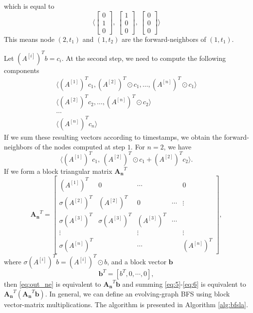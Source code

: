 \documentclass[11pt, conference, , compsocconf]{IEEEtran}
\theoremstyle{definition}
\begin{document}
which is equal to 
\[
\Big\langle
\begin{bmatrix}
0 \\
1 \\
0
\end{bmatrix},~
\begin{bmatrix}
1 \\
0 \\
0
\end{bmatrix},~
\begin{bmatrix}
0 \\
0 \\
0
\end{bmatrix}
\Big\rangle
\]
This means node $(2,t_1)$ and $(1,t_2)$ are the forward-neighbors of $(1,t_1)$. 

Let $(A^{[i]})^Tb = c_i$.
At the second step, we need to compute the following components
\begin{align}
  \label{eq:5}
 \big\langle (A^{[1]})^Tc_1,   (A^{[2]})^T\odot c_1, \ldots,  (A^{[n]})^T\odot c_1  \big\rangle  \\  
\big\langle (A^{[2]})^Tc_{2}, \ldots, (A^{[n]})^T\odot c_{2} \big\rangle \\
 \ldots  \\
  \big\langle (A^{[n]})^Tc_n \big\rangle 
\label{eq:6}
\end{align}
If we sum these resulting vectors according to timestamps, we obtain 
the forward-neighbors of the nodes computed at step $1$.
For $n =2$, we have 
\[
\Big\langle
(A^{[1]})^Tc_1,~
(A^{[2]})^T\odot c_1 + (A^{[2]})^T c_2
\Big\rangle.
\]
If we form a block triangular matrix $\bm{A_n}^T$ 
\[
\bm{A_n}^T = 
\begin{bmatrix}
(A^{[1]})^T &   0            & \cdots  &  & 0 \\
\sigma(A^{[2]})^T & (A^{[2]})^T & 0         &\cdots  & \vdots \\
\sigma(A^{[3]})^T & \sigma(A^{[3]})^T & (A^{[3]})^T & \cdots \\
   \vdots              &                              &      \vdots            &  &  \vdots \\
\sigma(A^{[n]})^T &                  &       \cdots                      &  & (A^{[n]})^T 
\end{bmatrix},
\]
where  $\sigma(A^{[i]})^Tb = (A^{[i]})^T\odot b$, and a block vector $\bm{b}$ 
\[
\bm{b}^T = [b^T, 0, \cdots, 0  ],
\]
then \eqref{eq:out_ne} is equivalent to $\bm{A_n}^T\bm{b}$ and 
summing \eqref{eq:5}-\eqref{eq:6} is equivalent to $\bm{A_n}^T(\bm{A_n}^T\bm{b})$. 
In general, we can define an evolving-graph BFS using 
block vector-matrix multiplications. The algorithm is presented in Algorithm
\ref{alg:bfsla}.
\end{document}
